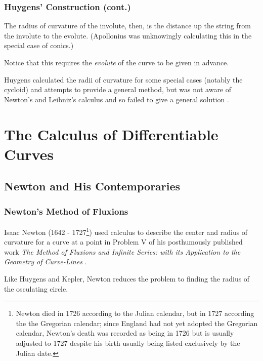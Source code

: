\documentclass{beamer}
\theoremstyle{definition}
\begin{document}
\begin{frame}
    \frametitle{Huygens' Construction (cont.)}

    The radius of curvature of the involute, then, is the distance up the string from
    the involute to the evolute. (Apollonius was unknowingly calculating this in the
    special case of conics.)

    Notice that this requires the \emph{evolute} of the curve to be given in advance.

    Huygens calculated the radii of curvature for some special cases (notably the cycloid)
    and attempts to provide a general method, but was not aware of Newton's and Leibniz's
    calculus and so failed to give a general solution \cite{unsat-hist}.
\end{frame}

\section{The Calculus of Differentiable Curves}

\subsection{Newton and His Contemporaries}

\begin{frame}
    \frametitle{Newton's Method of Fluxions}

    Isaac Newton (1642 - 1727\footnote{Newton died in 1726 according to the Julian calendar,
    but in 1727 according the the Gregorian calendar; since England had not yet adopted the
    Gregorian calendar, Newton's death was recorded as being in 1726 but is usually adjusted
    to 1727 despite his birth usually being listed exclusively by the Julian date.})
    used calculus to describe the center and radius of curvature for a curve at a point
    in Problem V of his posthumously published work \textit{The Method of Fluxions and Infinite
    Series: with its Application to the Geometry of Curve-Lines} \cite{newton}.

    Like Huygens and Kepler, Newton reduces the problem to finding the radius of the osculating
    circle.

\end{frame}
\end{document}
